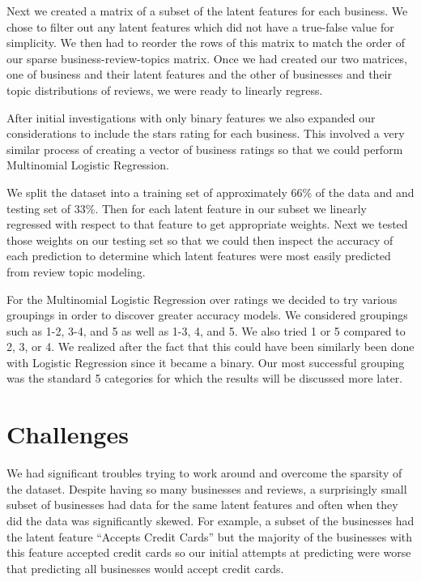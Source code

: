 \documentclass{article}
\begin{document}
Next we created a matrix of a subset of the latent features for each business.  We chose to filter out any latent features which did not have a true-false value for simplicity.  We then had to reorder the rows of this matrix to match the order of our sparse business-review-topics matrix.  Once we had created our two matrices, one of business and their latent features and the other of businesses and their topic distributions of reviews, we were ready to linearly regress.

After initial investigations with only binary features we also expanded our considerations to include the stars rating for each business.  This involved a very similar process of creating a vector of business ratings so that we could perform Multinomial Logistic Regression.


We split the dataset into a training set of approximately 66\% of the data and and testing set of 33\%.  Then for each latent feature in our subset we linearly regressed with respect to that feature to get appropriate weights.  Next we tested those weights on our testing set so that we could then inspect the accuracy of each prediction to determine which latent features were most easily predicted from review topic modeling. 

For the Multinomial Logistic Regression over ratings we decided to try various groupings in order to discover greater accuracy models.  We considered groupings such as 1-2, 3-4, and 5 as well as 1-3, 4, and 5.  We also tried 1 or 5 compared to 2, 3, or 4.  We realized after the fact that this could have been similarly been done with Logistic Regression since it became a binary.  Our most successful grouping was the standard 5 categories for which the results will be discussed more later.

\section{Challenges}

We had significant troubles trying to work around and overcome the sparsity of the dataset.  Despite having so many businesses and reviews, a surprisingly small subset of businesses had data for the same latent features and often when they did the data was significantly skewed.  For example, a subset of the businesses had the latent feature “Accepts Credit Cards” but the majority of the businesses with this feature accepted credit cards so our initial attempts at predicting were worse that predicting all businesses would accept credit cards.
\end{document}
